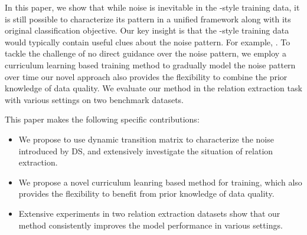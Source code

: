 In this paper, we show that while noise is inevitable in the \DS-style training data, it is still possible to characterize its pattern  in a unified framework along with its original classification objective. Our key insight is that the \DS-style training  data would typically contain useful clues about the noise pattern. For example, 
.
  To tackle the challenge of no direct guidance over the noise pattern, we employ a curriculum learning based training method to gradually model the noise pattern over time  our novel approach also provides the flexibility to combine the prior knowledge of data quality. 
We evaluate our method in the relation extraction task with various settings on two benchmark datasets. 


This paper makes the following specific contributions: 
\begin{itemize}
\item We propose to use dynamic transition matrix to characterize the noise introduced by DS, and extensively investigate the situation of relation extraction.
\item We propose a novel curriculum leanring based method for training, which also provides the flexibility to benefit from prior knowledge of data quality. 
\item Extensive experiments in two relation extraction datasets show that our method consistently improves the model performance in various settings.
\end{itemize}


